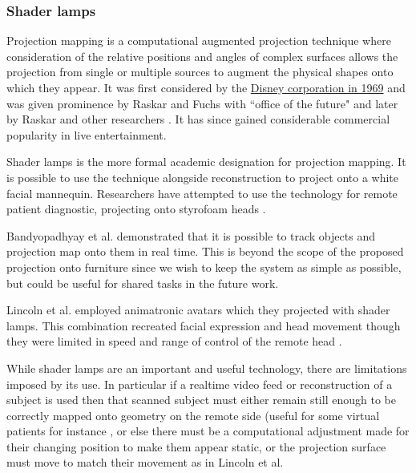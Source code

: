 \subsubsection{Shader lamps}
Projection mapping is a computational augmented projection technique where consideration of the relative positions and angles of complex surfaces allows the projection from single or multiple sources to augment the physical shapes onto which they appear. It was first considered by the \href{https://rabcup.com/the-history-of-3d-projection-mapping/}{Disney corporation in 1969} and was given prominence by Raskar and Fuchs with ``office of the future" \cite{Raskar1998} and later by Raskar and other researchers \cite{Raskar2001}. It has since gained considerable commercial popularity in live entertainment.\par
Shader lamps \cite{Raskar2001} is the more formal academic designation for projection mapping. It is possible to use the technique alongside reconstruction to project onto a white facial mannequin. Researchers have attempted to use the technology for remote patient diagnostic, projecting onto styrofoam heads  \cite{Rivera-Gutierrez2012}.\par          
Bandyopadhyay et al. demonstrated \cite{Bandyopadhyay2001} that it is possible to track objects and projection map \cite{Dalsgaard2011} onto them in real time. This is beyond the scope of the proposed projection onto furniture since we wish to keep the system as simple as possible, but could be useful for shared tasks in the future work.\par
Lincoln et al. employed animatronic avatars which they projected with shader lamps. This combination recreated facial expression and head movement though they were limited in speed and range of control of the remote head \cite{Lincoln2010}.\par
While shader lamps are an important and useful technology, there are limitations imposed by its use. In particular if a realtime video feed or reconstruction of a subject is used then that scanned subject must either remain still enough to be correctly mapped onto geometry on the remote side (useful for some virtual patients for instance \cite{Benjamin2012}, or else there must be a computational adjustment made for their changing position to make them appear static, or the projection surface must move to match their movement as in Lincoln et al.

